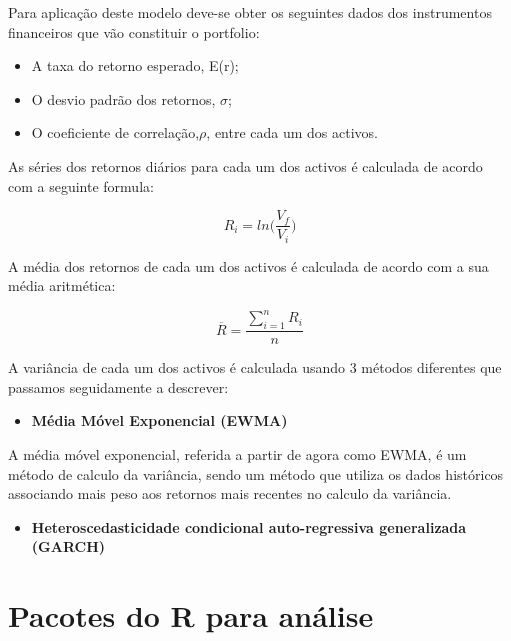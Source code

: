 \documentclass[
  12pt,
  a4paper,
  openany]{book}
\providecommand{\tightlist}{%
  \setlength{\itemsep}{0pt}\setlength{\parskip}{0pt}}
\begin{document}
Para aplicação deste modelo deve-se obter os seguintes dados dos instrumentos financeiros que vão constituir o portfolio:

\begin{itemize}
\tightlist
\item
  A taxa do retorno esperado, E(r);
\item
  O desvio padrão dos retornos, \(\sigma\);
\item
  O coeficiente de correlação,\(\rho\), entre cada um dos activos.
\end{itemize}

As séries dos retornos diários para cada um dos activos é calculada de acordo com a seguinte formula:

\begin{equation} 
  R_i = ln\Big(\frac{V_f}{V_i}\Big)
  \label{eq:logRet}
\end{equation}

A média dos retornos de cada um dos activos é calculada de acordo com a sua média aritmética:

\begin{equation} 
  \overline{R} = \frac{\displaystyle\sum_{i=1}^n R_i}{n}
  \label{eq:meanRet}
\end{equation}

A variância de cada um dos activos é calculada usando 3 métodos diferentes que passamos seguidamente a descrever:

\begin{itemize}
\tightlist
\item
  \textbf{Média Móvel Exponencial (EWMA)}
\end{itemize}

A média móvel exponencial, referida a partir de agora como EWMA, é um método de calculo da variância, sendo um método que utiliza os dados históricos associando mais peso aos retornos mais recentes no calculo da variância.

\begin{itemize}
\tightlist
\item
  \textbf{Heteroscedasticidade condicional auto-regressiva generalizada (GARCH)}
\end{itemize}

\hypertarget{pacotes-do-r-para-anuxe1lise}{%
\chapter{Pacotes do R para análise}\label{pacotes-do-r-para-anuxe1lise}}
\end{document}
